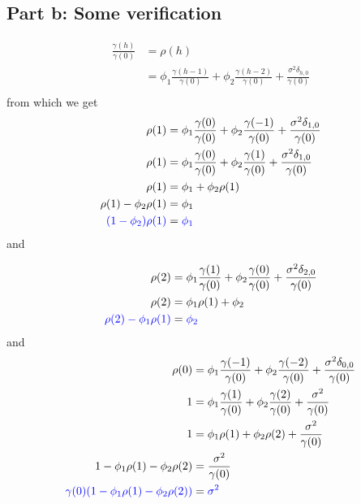 \documentclass[11pt, oneside]{article}   	%
\begin{document}
\subsection{Part b: Some verification}
\begin{equation}
\begin{aligned}
\frac{\gamma(h)}{\gamma(0)} &= \rho(h)\\
&=\phi_{1}\frac{\gamma(h-1)}{\gamma(0)} + \phi_{2}\frac{\gamma(h-2)}{\gamma(0)} + \frac{\sigma^{2}\delta_{h,0}}{\gamma(0)}\\
\end{aligned}
\end{equation}
from which we get
\begin{equation}\label{eq:e1}
\begin{aligned}
\rho(1) &= \phi_{1}\frac{\gamma(0)}{\gamma(0)} + \phi_{2}\frac{\gamma(-1)}{\gamma(0)} + \frac{\sigma^{2}\delta_{1,0}}{\gamma(0)}\\
\rho(1)&=\phi_{1}\frac{\gamma(0)}{\gamma(0)} + \phi_{2}\frac{\gamma(1)}{\gamma(0)} + \frac{\sigma^{2}\delta_{1,0}}{\gamma(0)}\\
\rho(1)&=\phi_{1} + \phi_{2}\rho(1)\\
\rho(1)-\phi_{2}\rho(1)&=\phi_{1} \\
\textcolor{blue}{(1-\phi_{2})\rho(1)} &= \textcolor{blue}{\phi_{1}}
\end{aligned}
\end{equation}
and 

\begin{equation}\label{eq:e2}
\begin{aligned}
\rho(2) &= \phi_{1}\frac{\gamma(1)}{\gamma(0)} + \phi_{2}\frac{\gamma(0)}{\gamma(0)} + \frac{\sigma^{2}\delta_{2,0}}{\gamma(0)}\\
\rho(2)&= \phi_{1}\rho(1) + \phi_{2}\\
\textcolor{blue}{\rho(2) -\phi_{1}\rho(1)} &= \textcolor{blue}{\phi_{2}}\\
\end{aligned}
\end{equation}
and
\begin{equation}\label{eq:e3}
\begin{aligned}
\rho(0) &= \phi_{1}\frac{\gamma(-1)}{\gamma(0)} + \phi_{2}\frac{\gamma(-2)}{\gamma(0)} + \frac{\sigma^{2}\delta_{0,0}}{\gamma(0)}\\
1 &= \phi_{1}\frac{\gamma(1)}{\gamma(0)} + \phi_{2}\frac{\gamma(2)}{\gamma(0)} + \frac{\sigma^{2}}{\gamma(0)}\\
1 &= \phi_{1}\rho(1) + \phi_{2}\rho(2) + \frac{\sigma^{2}}{\gamma(0)}\\
1 -\phi_{1}\rho(1) - \phi_{2}\rho(2) &= \frac{\sigma^{2}}{\gamma(0)}\\
\textcolor{blue}{\gamma(0)(1 -\phi_{1}\rho(1) - \phi_{2}\rho(2))} &= \textcolor{blue}{\sigma^{2}}\\
\end{aligned}
\end{equation}
\end{document}
